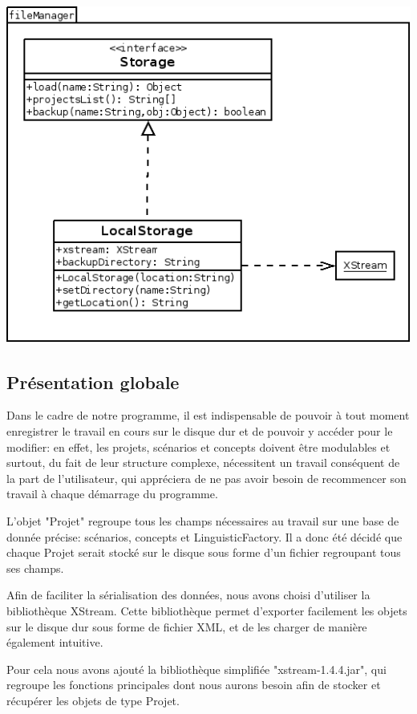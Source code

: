 \documentclass[12pt]{report}
\begin{document}
\begin{center}
\includegraphics[scale=0.55]{diversuml/fileManager.png}
\end{center}


\subsection{Présentation globale}

	Dans le cadre de notre programme, il est indispensable de pouvoir à tout moment enregistrer le travail en cours sur
le disque dur et de pouvoir y accéder pour le modifier: en effet, les projets, scénarios et concepts doivent être modulables
et surtout, du fait de leur structure complexe, nécessitent un travail conséquent de la part de l'utilisateur, qui appréciera
de ne pas avoir besoin de recommencer son travail à chaque démarrage du programme.

	L'objet "Projet" regroupe tous les champs nécessaires au travail sur une base de donnée précise: scénarios, concepts et LinguisticFactory.
Il a donc été décidé que chaque Projet serait stocké sur le disque sous forme d'un fichier regroupant tous ses champs.

	Afin de faciliter la sérialisation des données, nous avons choisi d'utiliser la bibliothèque XStream.
Cette bibliothèque permet d'exporter facilement les objets sur le disque dur sous forme de fichier XML, et de les charger de manière également
intuitive.

	Pour cela nous avons ajouté la bibliothèque simplifiée "xstream-1.4.4.jar", qui regroupe les fonctions principales dont nous
aurons besoin afin de stocker et récupérer les objets de type Projet.
\end{document}
